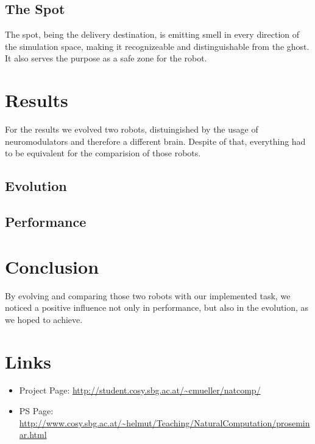 \documentclass[12pt,fleqn,a4paper]{article}
\begin{document}
\subsection{The Spot}
The spot, being the delivery destination, is emitting smell in every direction of the simulation space, making it recognizeable and distinguishable from the ghost. It also serves the purpose as a safe zone for the robot.

\section{Results}
For the results we evolved two robots, distuingished by the usage of neuromodulators and therefore a different brain. Despite of that, everything had to be equivalent for the comparision of those robots.

\subsection{Evolution}


\subsection{Performance}


\section{Conclusion}
By evolving and comparing those two robots with our implemented task, we noticed a positive influence not only in performance, but also in the evolution, as we hoped to achieve.

\newpage
\section{Links}

\begin{itemize}
\item Project Page: \url{http://student.cosy.sbg.ac.at/~cmueller/natcomp/}
\item PS Page: \url{http://www.cosy.sbg.ac.at/~helmut/Teaching/NaturalComputation/proseminar.html}
\end{itemize}
\end{document}

